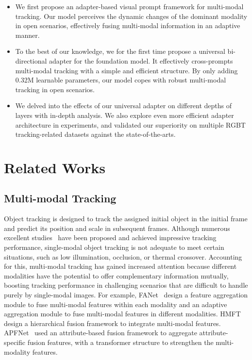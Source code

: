 \documentclass[letterpaper]{article} %
\begin{document}
\begin{itemize}
\item We first propose an adapter-based visual prompt framework for multi-modal tracking. Our model perceives the dynamic changes of the dominant modality in open scenarios, effectively fusing multi-modal information in an adaptive manner.

\item To the best of our knowledge, we for the first time propose a universal bi-directional adapter for the foundation model. It effectively cross-prompts multi-modal tracking with a simple and efficient structure. By only adding 0.32M learnable parameters, our model copes with robust multi-modal tracking in open scenarios.

\item We delved into the effects of our universal adapter on different depths of layers with in-depth analysis.  We also explore even more efficient adapter architecture in experiments, and validated our superiority on multiple RGBT tracking-related datasets against the state-of-the-arts.

\end{itemize}


\section{Related Works}

\subsection{Multi-modal Tracking}
Object tracking is designed to track the assigned initial object in the initial frame and predict its position and scale in subsequent frames. Although numerous excellent studies~\cite{ye2022joint,cui2022mixformer,lan2023procontext} have been proposed and achieved impressive tracking performance, single-modal object tracking is not adequate to meet certain situations, such as low illumination, occlusion, or thermal crossover. Accounting for this, multi-modal tracking has gained increased attention because different modalities have the potential to offer complementary information mutually, boosting tracking performance in challenging scenarios that are difficult to handle purely by single-modal images. For example, FANet~\cite{FANet} design a feature aggregation module to fuse multi-modal features within each modality and an adaptive aggregation module to fuse multi-modal features in different modalities. HMFT~\cite{HMFT} design a hierarchical fusion framework to integrate multi-modal features. APFNet~\cite{APFNet} used an attribute-based fusion framework to aggregate attribute-specific fusion features, with a transformer structure to strengthen the multi-modality features.
\end{document}
